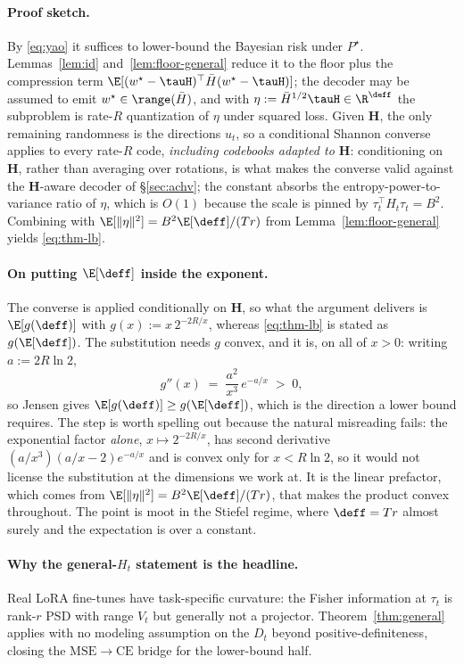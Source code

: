 \paragraph{Proof sketch.} By \eqref{eq:yao} it suffices to lower-bound
the Bayesian risk under $P^\star$. Lemmas~\ref{lem:id}
and~\ref{lem:floor-general} reduce it to the floor plus the
compression term $\E[(w^\star-\tauH)^\top\bar H(w^\star-\tauH)]$; the
decoder may be assumed to emit $w^\star \in \range(\bar H)$, and with
$\eta := \bar H^{1/2}\tauH \in \R^{\deff}$ the subproblem is rate-$R$
quantization of $\eta$ under squared loss. Given $\boldsymbol H$, the
only remaining randomness is the directions $u_t$, so a conditional
Shannon converse applies to every rate-$R$ code, \emph{including
codebooks adapted to $\boldsymbol H$}: conditioning on
$\boldsymbol H$, rather than averaging over rotations, is what makes
the converse valid against the $\boldsymbol H$-aware decoder of
\S\ref{sec:achv}; the constant absorbs the entropy-power-to-variance
ratio of $\eta$, which is $O(1)$ because the scale is pinned by
$\tau_t^\top H_t \tau_t = B^2$. Combining with
$\E[\|\eta\|^2] = B^2\E[\deff]/(Tr)$ from
Lemma~\ref{lem:floor-general} yields \eqref{eq:thm-lb}.

\paragraph{On putting $\E[\deff]$ inside the exponent.} The converse is
applied conditionally on $\boldsymbol H$, so what the argument delivers is
$\E[g(\deff)]$ with $g(x) := x\,2^{-2R/x}$, whereas \eqref{eq:thm-lb} is
stated as $g(\E[\deff])$. The substitution needs $g$ convex, and it is, on
all of $x > 0$: writing $a := 2R\ln 2$,
\[
  g''(x) \;=\; \frac{a^{2}}{x^{3}}\,e^{-a/x} \;>\; 0 ,
\]
so Jensen gives $\E[g(\deff)] \geq g(\E[\deff])$, which is the direction a
lower bound requires. The step is worth spelling out because the natural
misreading fails: the exponential factor \emph{alone}, $x \mapsto
2^{-2R/x}$, has second derivative $(a/x^{3})(a/x - 2)e^{-a/x}$ and is
convex only for $x < R\ln 2$, so it would not license the substitution at
the dimensions we work at. It is the linear prefactor, which comes from
$\E[\|\eta\|^2] = B^2\E[\deff]/(Tr)$, that makes the product convex
throughout. The point is moot in the Stiefel regime, where $\deff = Tr$
almost surely and the expectation is over a constant.

\paragraph{Why the general-$H_t$ statement is the headline.} Real LoRA
fine-tunes have task-specific curvature: the Fisher information at
$\tau_t$ is rank-$r$ PSD with range $V_t$ but generally not a
projector. Theorem~\ref{thm:general} applies with no modeling
assumption on the $D_t$ beyond positive-definiteness, closing the
$\mathrm{MSE}\to\mathrm{CE}$ bridge for the lower-bound half.
